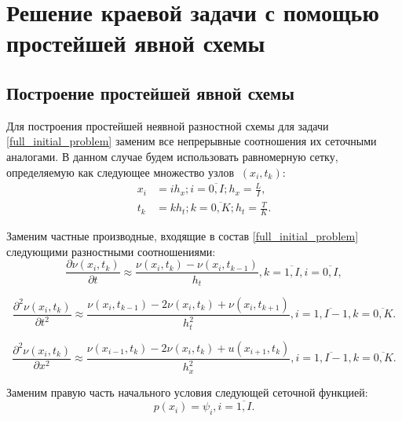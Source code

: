 \section{Решение краевой задачи с помощью простейшей явной схемы}
{
	\subsection{Построение простейшей явной схемы}{
			Для построения простейшей неявной разностной схемы для задачи \eqref{full_initial_problem} заменим все непрерывные соотношения их сеточными аналогами. В данном случае будем использовать равномерную сетку, определяемую как следующее множество узлов $\ (x_{i}, t_{k}) $:
			\begin{equation} \label{grid_xt}
				\begin{split}
				x_{i} &= ih_x; i = \overline{ 0, I}; h_x = \frac{L}{I},\\
				t_{k} &= kh_t; k = \overline{ 0, K}; h_t = \frac{T}{K}.
				\end{split}
			\end{equation}
			
			Заменим частные производные, входящие в состав \eqref{full_initial_problem} следующими разностными соотношениями:
			\begin{equation} \label{time_analog_1}
		 		\frac{\partial \nu(x_i, t_k)}{\partial t} \approx \frac{\nu(x_i, t_k) - \nu(x_i, t_{k-1})}{h_t}, k =  \overline{ 1, I}, i =  \overline{ 0, I},
			\end{equation}
			
			\begin{equation} \label{time_analog}
		 		\frac{\partial^2 \nu(x_i, t_k)}{\partial t^2} \approx \frac{\nu(x_i, t_{k-1}) - 2\nu(x_i, t_k) + \nu(x_i, t_{k+1})}{h_t^2},  i =  \overline{ 1, I-1}, k =  \overline{ 0, K}.
			\end{equation}
			
			\begin{equation} \label{dimensional_analog}
			\frac{\partial^2 \nu(x_i, t_k)}{\partial x^2} \approx \frac{\nu(x_{i-1}, t_k) - 2\nu(x_i, t_k) + u(x_{i+1}, t_k)}{h_x^2},  i =  \overline{ 1, I-1}, k =  \overline{ 0, K}.
			\end{equation}
			
			Заменим правую часть начального условия следующей сеточной функцией:
			\begin{equation} \label{gamma_tk}
				p(x_i) = \psi_i, i = \overline{1, I}.
			\end{equation}
			
}}
